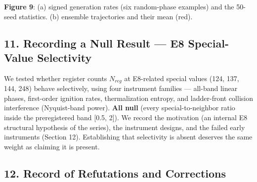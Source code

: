 \documentclass[
  a4paper,
]{article}
\begin{document}
\textbf{Figure 9}: (a) signed generation rates (six random-phase
examples) and the 50-seed statistics. (b) ensemble trajectories and
their mean (red).

\subsection{11. Recording a Null Result --- E8 Special-Value
Selectivity}\label{recording-a-null-result-e8-special-value-selectivity}

We tested whether register counts \(N_{reg}\) at E8-related special
values (124, 137, 144, 248) behave selectively, using four instrument
families --- all-band linear phases, first-order ignition rates,
thermalization entropy, and ladder-front collision interference
(Nyquist-band power). \textbf{All null} (every special-to-neighbor ratio
inside the preregistered band {[}0.5, 2{]}). We record the motivation
(an internal E8 structural hypothesis of the series), the instrument
designs, and the failed early instruments (Section 12). Establishing
that selectivity is absent deserves the same weight as claiming it is
present.

\subsection{12. Record of Refutations and
Corrections}\label{record-of-refutations-and-corrections}
\end{document}
